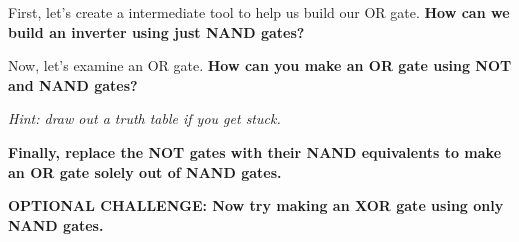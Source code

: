 \begin{enumerate}
    \qitem First, let's create a intermediate tool to help us build our OR gate. \textbf{How can we build an inverter using just NAND gates?} \\
    \ws{\vspace{90px}}

    \qitem Now, let's examine an OR gate. \textbf{How can you make an OR gate using NOT and NAND gates?}
    
    \emph{Hint: draw out a truth table if you get stuck.} \\

    \ws{\vspace{90px}}

    \qitem \textbf{Finally, replace the NOT gates with their NAND equivalents to make an OR gate solely out of NAND gates.} \\

    \ws{\vspace{90px}}


    \qitem \textbf{OPTIONAL CHALLENGE: Now try making an XOR gate using only NAND gates.} \\

    \ws{\vspace{90px}}


\end{enumerate}
